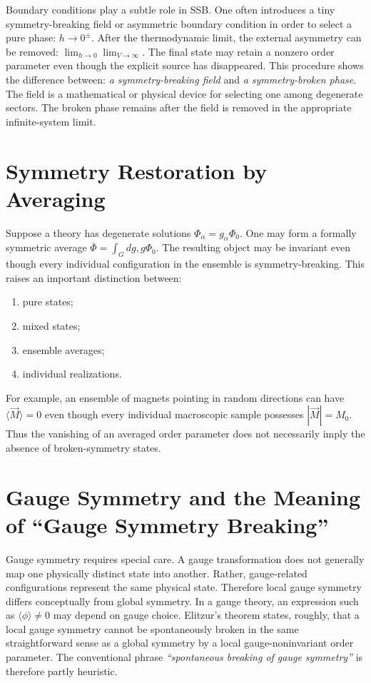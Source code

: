 Boundary conditions play a subtle role in SSB.
One often introduces a tiny symmetry-breaking field or asymmetric boundary
condition in order to select a pure phase: $h\rightarrow 0^\pm$.
After the thermodynamic limit, the external asymmetry can be removed:
$\lim_{h\to0}\lim_{V\to\infty}$.
The final state may retain a nonzero order parameter even though the explicit
source has disappeared.
This procedure shows the difference between: \emph{a symmetry-breaking field}
and \emph{a symmetry-broken phase}.
The field is a mathematical or physical device for selecting one among 
degenerate sectors. The broken phase remains after the field is removed in the
appropriate infinite-system limit.

\section{Symmetry Restoration by Averaging}
\label{sp:rs}

Suppose a theory has degenerate solutions $\Phi_\alpha=g_\alpha\Phi_0$.
One may form a formally symmetric average
$\overline{\Phi}=\int_G dg,g\Phi_0$.
The resulting object may be invariant even though every individual
configuration in the ensemble is symmetry-breaking.
This raises an important distinction between:
\begin{enumerate}
\item pure states;
\item mixed states;
\item ensemble averages;
\item individual realizations.
\end{enumerate}
For example, an ensemble of magnets pointing in random directions can have
$\langle\vec{M}\rangle=0$ even though every individual macroscopic sample 
possesses $|\vec{M}|=M_0$.
Thus the vanishing of an averaged order parameter does not necessarily imply
the absence of broken-symmetry states.

\section{Gauge Symmetry and the Meaning of ``Gauge Symmetry Breaking''}
\label{sp:gs}

Gauge symmetry requires special care.
A gauge transformation does not generally map one physically distinct state
into another.  Rather, gauge-related configurations represent the same physical
state.
Therefore local gauge symmetry differs conceptually from global symmetry.
In a gauge theory, an expression such as
$\langle\phi\rangle\neq 0$ may depend on gauge choice.
Elitzur's theorem states, roughly, that a local gauge symmetry cannot be
spontaneously broken in the same straightforward sense as a global symmetry by
a local gauge-noninvariant order parameter.
The conventional phrase \emph{``spontaneous breaking of gauge symmetry''}
is therefore partly heuristic.

